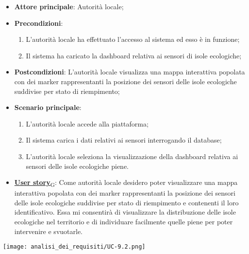 \begin{itemize}
	\item \textbf{Attore principale}: Autorità locale;
	\item \textbf{Precondizioni}:
	      \begin{enumerate}
		      \item L'autorità locale ha effettuato l'accesso al sistema ed esso è in funzione;
		      \item Il sistema ha caricato la dashboard relativa ai sensori di isole ecologiche;
	      \end{enumerate}
	\item \textbf{Postcondizioni}: L'autorità locale visualizza una mappa interattiva popolata con dei marker rappresentanti la posizione dei sensori delle isole ecologiche
	      suddivise per stato di riempimento;
	\item \textbf{Scenario principale}:
	      \begin{enumerate}
		      \item L'autorità locale accede alla piattaforma;
		      \item Il sistema carica i dati relativi ai sensori interrogando il database;
		      \item L'autorità locale seleziona la visualizzazione della dashboard relativa ai sensori delle isole ecologiche piene.
	      \end{enumerate}
	\item \href{https://7last.github.io/docs/rtb/documentazione-interna/glossario\#user-story}{\textbf{User story}\textsubscript{G}}:
	      Come autorità locale desidero poter visualizzare una mappa interattiva popolata con dei marker rappresentanti la posizione dei sensori delle isole ecologiche
	      suddivise per stato di riempimento e contenenti il loro identificativo.
	      Essa mi consentirà di visualizzare la distribuzione delle isole ecologiche nel territorio e di individuare facilmente quelle piene per poter intervenire e svuotarle.
\end{itemize}
\begin{center}
	\texttt{[image: analisi\_dei\_requisiti/UC-9.2.png]}
\end{center}

